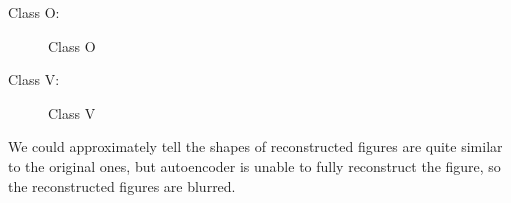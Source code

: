 \documentclass[11pt]{article} \usepackage{fullpage} \usepackage{graphicx} \usepackage{epstopdf} \usepackage{color} \usepackage{psfrag} \usepackage{pdfsync}\usepackage{indentfirst}\usepackage{subfigure}\usepackage{float}\usepackage[section]{placeins}
\begin{document}
Class $\mathrm{O}$:
\begin{figure}[H]
\centering
{}
\caption{Class O}
\end{figure}

Class $\mathrm{V}$:
\begin{figure}[H]
\centering
{}
\caption{Class V}
\end{figure}

We could approximately tell the shapes of reconstructed figures are quite similar to the original ones, but autoencoder is unable to fully reconstruct the figure, so the reconstructed figures are blurred.
\end{document}
